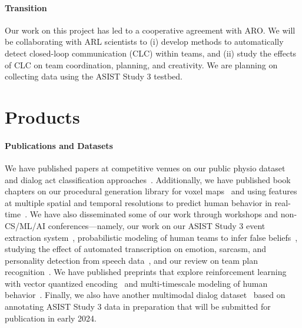 \documentclass[11pt,article,oneside]{memoir}
\begin{document}
\paragraph{Transition} Our work on this project has led to a cooperative
agreement with ARO. We will be collaborating with ARL scientists to (i) develop
methods to automatically detect closed-loop communication (CLC) within teams,
and (ii) study the effects of CLC on team coordination, planning, and
creativity. We are planning on collecting data using the ASIST Study 3 testbed.



\section{Products}

\paragraph{Publications and Datasets} We have published papers at competitive
venues on our public physio dataset~\citep{pyarelal2023the} and dialog act
classification approaches~\citep{qamar-etal-2023-speaking,
miah-etal-2023-hierarchical}.  Additionally, we have published book chapters on
our procedural generation library for voxel maps~\citep{Pyarelal.ea:2022} and
using features at multiple spatial and temporal resolutions to predict human
behavior in real-time~\citep{Zhang.ea:2022c}. We have also disseminated some of
our work through workshops and non-CS/ML/AI conferences---namely, our work on
our ASIST Study 3 event extraction system~\citep{nitschke-etal-2022-rule},
probabilistic modeling of human teams to infer false
beliefs~\citep{Soares.ea:2021}, studying the effect of automated transcription
on emotion, sarcasm, and personality detection from speech
data~\citep{culnan-etal-2021-ire}, and our review on team plan
recognition~\citep{Rieffer_Champlin_2023}.  We have published preprints that
explore reinforcement learning with vector quantized
encoding~\citep{Zhang.ea:2022a} and multi-timescale modeling of human
behavior~\citep{Basavaraj.ea:2022}. Finally, we also have another multimodal
dialog dataset~\citep{multicat} based on annotating ASIST Study 3 data in
preparation that will be submitted for publication in early 2024.
\end{document}
